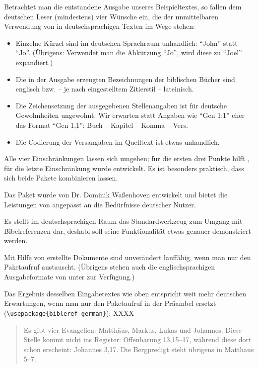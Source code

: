 Betrachtet man die entstandene Ausgabe unseres Beispieltextes, so fallen
dem deutschen Leser (mindestens) vier Wünsche ein, die der unmittelbaren Verwendung von
 in deutschsprachigen Texten im Wege stehen: 

\begin{itemize}
    \item Einzelne Kürzel sind im deutschen Sprachraum unhandlich: \enquote{John} statt \enquote{Jo}.
    (Übrigens: Verwendet man die Abkürzung \enquote{Jo}, wird diese zu \enquote{Joel} expandiert.)
    \item Die in der Ausgabe erzeugten Bezeichnungen der biblischen Bücher sind englisch bzw. 
    -- je nach eingestelltem Zitierstil -- lateinisch.
    \item Die Zeichensetzung der ausgegebenen Stellenangaben ist für deutsche Gewohnheiten ungewohnt: 
    Wir erwarten statt Angaben wie \enquote{Gen 1:1} eher das Format \enquote{Gen 1,1}: 
    Buch -- Kapitel -- Komma -- Vers.
    \item Die Codierung der Versangaben im Quelltext ist etwas unhandlich.
\end{itemize}

Alle vier Einschränkungen lassen sich umgehen; 
für die ersten drei Punkte hilft , 
für die letzte Einschränkung wurde  entwickelt.
Es ist besonders praktisch, dass sich beide Pakete kombinieren lassen.



Das Paket  wurde von Dr. Dominik Waßenhoven entwickelt und bietet die Leistungen von  
angepasst an die Bedürfnisse deutscher Nutzer.

Es stellt im deutschsprachigen Raum das Standardwerkzeug zum Umgang mit Bibelreferenzen dar,
deshabl soll seine Funktionalität etwas genauer demonstriert werden.

Mit Hilfe von  erstellte Dokumente sind unverändert lauffähig, wenn man nur
den Paketaufruf austauscht. (Übrigens stehen auch die englischsprachigen Ausgabeformate von
 unter  zur Verfügung.)

Das Ergebnis desselben Eingabetextes wie oben entspricht weit mehr deutschen Erwartungen, wenn man
nur den Paketaufruf in der Präambel ersetzt 
(\lstinline/\usepackage{bibleref-german}/): XXXX

\begin{quotation}
    Es gibt vier Evangelien: Matthäus, Markus, Lukas und Johannes.
    Diese Stelle kommt nicht ins Register: Offenbarung 13,15–17, während diese dort schon
    erscheint: Johannes 3,17. Die Bergpredigt steht übrigens in Matthäus 5–7.
\end{quotation}

